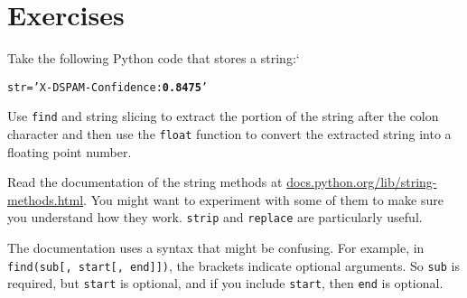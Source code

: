 \section{Exercises}

\begin{ex}
Take the following Python code that stores a string:`

\beforeverb
\begin{alltt}
str = 'X-DSPAM-Confidence: {\bf 0.8475}'
\end{alltt}
\afterverb

Use {\tt find} and string slicing to extract the portion
of the string after the colon character and then use the 
{\tt float} function to convert the extracted string 
into a floating point number.

\end{ex}


\begin{ex}

Read the documentation of the string methods at
\url{docs.python.org/lib/string-methods.html}.  You
might want to experiment with some of them to make sure
you understand how they work.  {\tt strip} and
{\tt replace} are particularly useful.

The documentation uses a syntax that might be confusing.
For example, in \verb"find(sub[, start[, end]])", the brackets
indicate optional arguments.  So {\tt sub} is required, but
{\tt start} is optional, and if you include {\tt start},
then {\tt end} is optional.
\end{ex}


